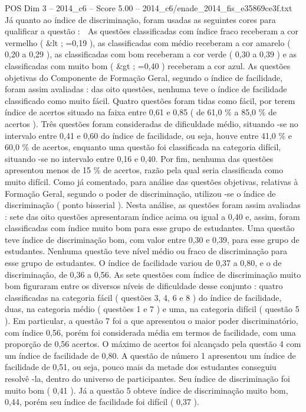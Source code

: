 \begin{textsample}{POS Dim 3 – 2014\_c6 – Score 5.00 – 2014\_c6/enade\_2014\_fis\_e35869ce3f.txt}
Já quanto ao índice de discriminação, foram usadas as seguintes cores para qualificar a questão :  As questões classificadas com índice fraco receberam a cor vermelho ( \&lt ; =0,19 ), as classificadas com médio receberam a cor amarelo ( 0,20 a 0,29 ), as classificadas com bom receberam a cor verde ( 0,30 a 0,39 ) e as classificadas com muito bom ( \&gt ; =0,40 ) receberam a cor azul.
As questões objetivas do Componente de Formação Geral, segundo o índice de facilidade, foram assim avaliadas : das oito questões, nenhuma teve o índice de facilidade classificado como muito fácil.
Quatro questões foram tidas como fácil, por terem índice de acertos situado na faixa entre 0,61 e 0,85 ( de 61,0 \% a 85,0 \% de acertos ).
Três questões foram consideradas de dificuldade médio, situando -se no intervalo entre 0,41 e 0,60 do índice de facilidade, ou seja, houve entre 41,0 \% e 60,0 \% de acertos, enquanto uma questão foi classificada na categoria difícil, situando -se no intervalo entre 0,16 e 0,40.
Por fim, nenhuma das questões apresentou menos de 15 \% de acertos, razão pela qual seria classificada como muito difícil.
Como já comentado, para análise das questões objetivas, relativas à Formação Geral, segundo o poder de discriminação, utilizou -se o índice de discriminação ( ponto bisserial ).
Nesta análise, as questões foram assim avaliadas : sete das oito questões apresentaram índice acima ou igual a 0,40 e, assim, foram classificadas com índice muito bom para esse grupo de estudantes.
Uma questão teve índice de discriminação bom, com valor entre 0,30 e 0,39, para esse grupo de estudantes.
Nenhuma questão teve nível médio ou fraco de discriminação para esse grupo de estudantes.
O índice de facilidade variou de 0,37 a 0,80, e o de discriminação, de 0,36 a 0,56.
As sete questões com índice de discriminação muito bom figuraram entre os diversos níveis de dificuldade desse conjunto : quatro classificadas na categoria fácil ( questões 3, 4, 6 e 8 ) do índice de facilidade, duas, na categoria médio ( questões 1 e 7 ) e uma, na categoria difícil ( questão 5 ).
Em particular, a questão 7 foi a que apresentou o maior poder discriminatório, com índice 0,56, porém foi considerada média em termos de facilidade, com uma proporção de 0,56 acertos.
O máximo de acertos foi alcançado pela questão 4 com um índice de facilidade de 0,80.
A questão de número 1 apresentou um índice de facilidade de 0,51, ou seja, pouco mais da metade dos estudantes conseguiu resolvê -la, dentro do universo de participantes.
Seu índice de discriminação foi muito bom ( 0,41 ).
Já a questão 5 obteve índice de discriminação muito bom, 0,44, porém seu índice de facilidade foi difícil ( 0,37 ).

\end{textsample}
